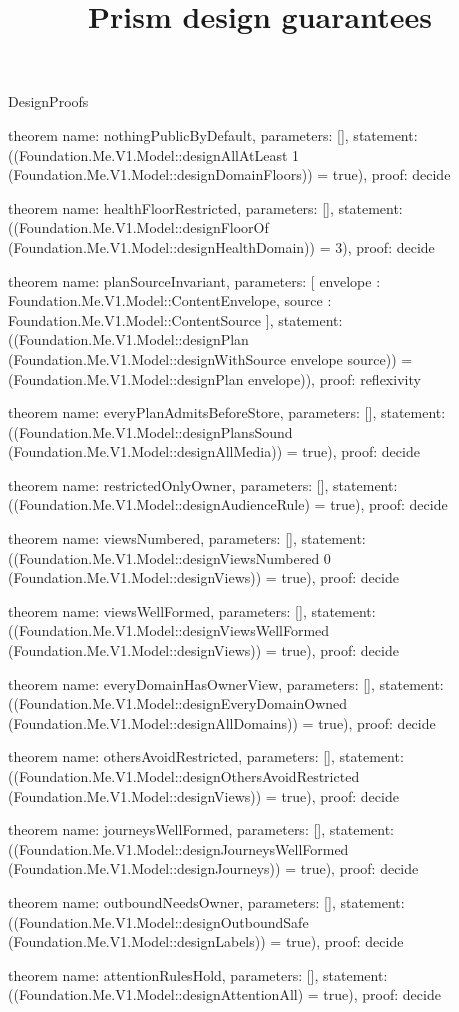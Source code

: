 \begin{lexlean}{DesignProofs}
\title{Prism design guarantees}
\begin{semanticmodule}
theorem{
  name: nothingPublicByDefault,
  parameters: [],
  statement: ((Foundation.Me.V1.Model::designAllAtLeast 1 (Foundation.Me.V1.Model::designDomainFloors)) = true),
  proof: decide{}
}

theorem{
  name: healthFloorRestricted,
  parameters: [],
  statement: ((Foundation.Me.V1.Model::designFloorOf (Foundation.Me.V1.Model::designHealthDomain)) = 3),
  proof: decide{}
}

theorem{
  name: planSourceInvariant,
  parameters: [
    envelope : Foundation.Me.V1.Model::ContentEnvelope,
    source : Foundation.Me.V1.Model::ContentSource
  ],
  statement: ((Foundation.Me.V1.Model::designPlan (Foundation.Me.V1.Model::designWithSource envelope source)) = (Foundation.Me.V1.Model::designPlan envelope)),
  proof: reflexivity{}
}

theorem{
  name: everyPlanAdmitsBeforeStore,
  parameters: [],
  statement: ((Foundation.Me.V1.Model::designPlansSound (Foundation.Me.V1.Model::designAllMedia)) = true),
  proof: decide{}
}

theorem{
  name: restrictedOnlyOwner,
  parameters: [],
  statement: ((Foundation.Me.V1.Model::designAudienceRule) = true),
  proof: decide{}
}

theorem{
  name: viewsNumbered,
  parameters: [],
  statement: ((Foundation.Me.V1.Model::designViewsNumbered 0 (Foundation.Me.V1.Model::designViews)) = true),
  proof: decide{}
}

theorem{
  name: viewsWellFormed,
  parameters: [],
  statement: ((Foundation.Me.V1.Model::designViewsWellFormed (Foundation.Me.V1.Model::designViews)) = true),
  proof: decide{}
}

theorem{
  name: everyDomainHasOwnerView,
  parameters: [],
  statement: ((Foundation.Me.V1.Model::designEveryDomainOwned (Foundation.Me.V1.Model::designAllDomains)) = true),
  proof: decide{}
}

theorem{
  name: othersAvoidRestricted,
  parameters: [],
  statement: ((Foundation.Me.V1.Model::designOthersAvoidRestricted (Foundation.Me.V1.Model::designViews)) = true),
  proof: decide{}
}

theorem{
  name: journeysWellFormed,
  parameters: [],
  statement: ((Foundation.Me.V1.Model::designJourneysWellFormed (Foundation.Me.V1.Model::designJourneys)) = true),
  proof: decide{}
}

theorem{
  name: outboundNeedsOwner,
  parameters: [],
  statement: ((Foundation.Me.V1.Model::designOutboundSafe (Foundation.Me.V1.Model::designLabels)) = true),
  proof: decide{}
}

theorem{
  name: attentionRulesHold,
  parameters: [],
  statement: ((Foundation.Me.V1.Model::designAttentionAll) = true),
  proof: decide{}
}
\end{semanticmodule}
\end{lexlean}
